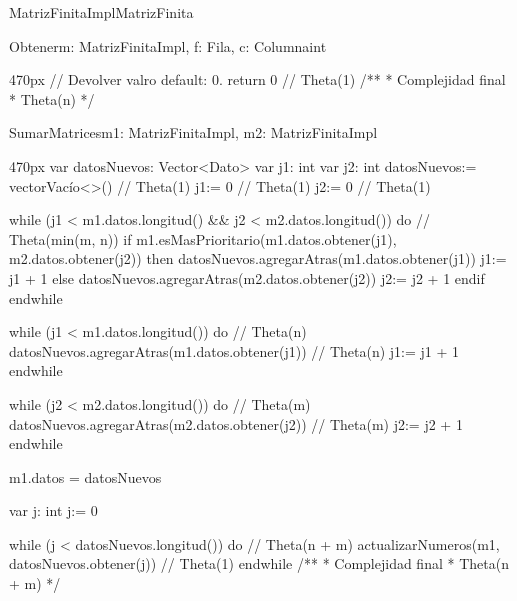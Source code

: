 \documentclass[10pt,a4paper]{article}
\begin{document}
\begin{ModuloImplements}{MatrizFinitaImpl}{MatrizFinita}
\begin{proc}{Obtener}{\Inout m: MatrizFinitaImpl, \In f: Fila, \In c: Columna}{int}
\begin{ImplementationCode}{470px}
      // Devolver valro default: 0.
      return 0 // Theta(1)
      /**
       * Complejidad final
       * Theta(n)
       */
      \end{ImplementationCode}
  \end{proc}
  \newpage
  \begin{proc}{SumarMatrices}{\Inout m1: MatrizFinitaImpl, \In m2: MatrizFinitaImpl}{}
    \begin{ImplementationCode}{470px}
      var datosNuevos: Vector<Dato>
      var j1: int
      var j2: int
          datosNuevos:= vectorVacío<>()       // Theta(1)
          j1:= 0                              // Theta(1)
          j2:= 0                              // Theta(1)
      
      while (j1 < m1.datos.longitud() && j2 < m2.datos.longitud()) do // Theta(min(m, n))
        if m1.esMasPrioritario(m1.datos.obtener(j1), m2.datos.obtener(j2)) then
          datosNuevos.agregarAtras(m1.datos.obtener(j1))
          j1:= j1 + 1
        else
          datosNuevos.agregarAtras(m2.datos.obtener(j2))
          j2:= j2 + 1
        endif
      endwhile

      while (j1 < m1.datos.longitud()) do                   // Theta(n)
        datosNuevos.agregarAtras(m1.datos.obtener(j1))      // Theta(n)
        j1:= j1 + 1
      endwhile

      while (j2 < m2.datos.longitud()) do                   // Theta(m)
        datosNuevos.agregarAtras(m2.datos.obtener(j2))      // Theta(m)
        j2:= j2 + 1
      endwhile

      m1.datos = datosNuevos

      var j: int
          j:= 0

      while (j < datosNuevos.longitud()) do            // Theta(n + m)
        actualizarNumeros(m1, datosNuevos.obtener(j)) // Theta(1)
      endwhile
      /**
       * Complejidad final
       * Theta(n + m)
       */
    \end{ImplementationCode}
  \end{proc}
\end{ModuloImplements}
\end{document}
